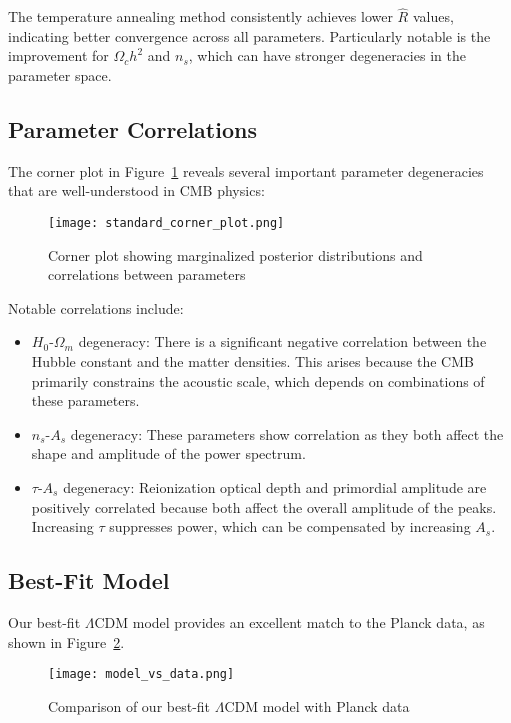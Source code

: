 \documentclass[11pt]{article}
\theoremstyle{definition}
\begin{document}
The temperature annealing method consistently achieves lower $\hat{R}$ values, indicating better convergence across all parameters. Particularly notable is the improvement for $\Omega_c h^2$ and $n_s$, which can have stronger degeneracies in the parameter space.

\subsection{Parameter Correlations}

The corner plot in Figure~\ref{fig:corner} reveals several important parameter degeneracies that are well-understood in CMB physics:

\begin{figure}[htbp]
  \centering
  \texttt{[image: standard\_corner\_plot.png]}
  \caption{Corner plot showing marginalized posterior distributions and correlations between parameters}
  \label{fig:corner}
\end{figure}

Notable correlations include:

\begin{itemize}
  \item $H_0$-$\Omega_m$ degeneracy: There is a significant negative correlation between the Hubble constant and the matter densities. This arises because the CMB primarily constrains the acoustic scale, which depends on combinations of these parameters.
  
  \item $n_s$-$A_s$ degeneracy: These parameters show correlation as they both affect the shape and amplitude of the power spectrum.
  
  \item $\tau$-$A_s$ degeneracy: Reionization optical depth and primordial amplitude are positively correlated because both affect the overall amplitude of the peaks. Increasing $\tau$ suppresses power, which can be compensated by increasing $A_s$.
\end{itemize}

\subsection{Best-Fit Model}

Our best-fit $\Lambda$CDM model provides an excellent match to the Planck data, as shown in Figure~\ref{fig:best-fit}.

\begin{figure}[htbp]
  \centering
  \texttt{[image: model\_vs\_data.png]}
  \caption{Comparison of our best-fit $\Lambda$CDM model with Planck data}
  \label{fig:best-fit}
\end{figure}
\end{document}
